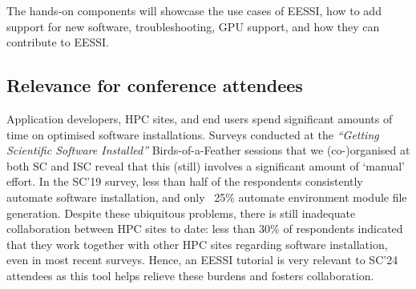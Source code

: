 The hands-on components will showcase the use cases of EESSI, how to add support for new software,
troubleshooting, GPU support, and how they can contribute to EESSI.

\subsection*{Relevance for conference attendees}

Application developers, HPC sites, and end users %
spend significant amounts of time on optimised software installations. Surveys conducted at the
\emph{``Getting Scientific Software Installed''} Birds-of-a-Feather sessions that we (co-)organised at both SC and ISC
reveal that this (still) involves a significant amount of `manual' effort.
In the SC'19 survey,
less than half of the respondents consistently automate software installation,
and only ~25\% automate environment module file generation.
Despite these ubiquitous problems,
there is still inadequate collaboration
between HPC sites to date: less than 30\% of respondents indicated that they
work together with other HPC sites regarding software installation, even in most recent surveys.
Hence, an EESSI tutorial is very relevant to SC'24 attendees as this tool helps relieve these burdens and fosters
collaboration.


